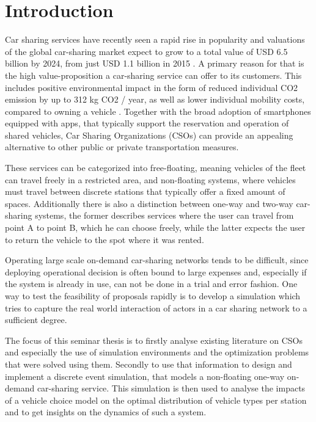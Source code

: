 \clearpage
\section{Introduction}
\label{sec:Intro}

Car sharing services have recently seen a rapid rise in popularity 
and valuations of the global car-sharing market expect to grow to
a total value of USD 6.5 billion by 2024, from just USD 1.1 billion in 2015 \cite{Emissions2018}. 
A primary reason for that is the high value-proposition a car-sharing service
can offer to its customers. This includes positive environmental impact in the form of
reduced individual CO2 emission by up to 312 kg CO2 / year, as well as
lower individual mobility costs, compared to owning a vehicle \cite{UlmEnv2011}. Together with the
broad adoption of smartphones equipped with apps, that typically
support the reservation and operation of shared vehicles, Car Sharing Organizations (CSOs)
can provide an appealing alternative to other public or private transportation measures.

These services can be categorized into free-floating, meaning vehicles of the fleet
can travel freely in a restricted area, and non-floating systems, where vehicles must travel
between discrete stations that typically offer a fixed amount of spaces. Additionally
there is also a distinction between one-way and two-way car-sharing systems, the former
describes services where the user can travel from point A to point B, which he can choose
freely, while the latter expects the user to return the vehicle to the spot where it was
rented.

Operating large scale on-demand car-sharing networks tends to be difficult, since
deploying operational decision is often bound to large expenses and, especially if the
system is already in use, can not be done in a trial and error fashion. One way to test the feasibility of
proposals rapidly is to develop a simulation which tries to capture the real world
interaction of actors in a car sharing network to a sufficient degree.

The focus of this seminar thesis is to firstly analyse existing literature on CSOs and especially
the use of simulation environments and the optimization problems that were solved using them.
Secondly to use that information to design
and implement a discrete event simulation, that models a non-floating one-way on-demand
car-sharing service. This simulation is then used to analyse the impacts of a vehicle
choice model on the optimal distribution of vehicle types per station and to get
insights on the dynamics of such a system. 
